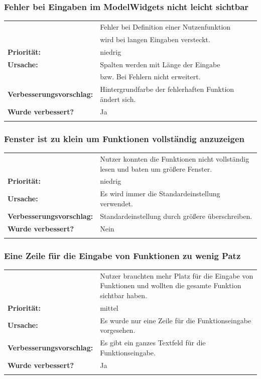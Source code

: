 \documentclass{article}
\begin{document}
\subsubsection*{Fehler bei Eingaben im ModelWidgets nicht leicht sichtbar}
\begin{tabular}{ll}
\begin{tabularx}{\textwidth}{rX}
    \textbf{Beschreibung:} & Fehler bei Definition einer Nutzenfunktion \\
    & wird bei langen Eingaben versteckt. \\
    \textbf{Priorität:} & niedrig\\
    \textbf{Ursache:} & Spalten werden mit Länge der Eingabe \\
    &  bzw. Bei Fehlern nicht erweitert. \\
    \textbf{Verbesserungsvorschlag:} & Hintergrundfarbe der fehlerhaften Funktion ändert sich. \\
    \textbf{Wurde verbessert?} & Ja \\
    \end{tabularx}
\end{tabular}

\subsubsection*{Fenster ist zu klein um Funktionen vollständig anzuzeigen}
\begin{tabular}{ll}
\begin{tabularx}{\textwidth}{rX}
    \textbf{Beschreibung:} & Nutzer konnten die Funktionen nicht vollständig lesen und baten um größere Fenster.\\
    \textbf{Priorität:} & niedrig\\
    \textbf{Ursache:} & Es wird immer die Standardeinstellung verwendet. \\
    \textbf{Verbesserungsvorschlag:} & Standardeinstellung durch größere überschreiben.\\
    \textbf{Wurde verbessert?} & Nein\\
    \end{tabularx}
\end{tabular}

\subsubsection*{Eine Zeile für die Eingabe von Funktionen zu wenig Patz}
\begin{tabular}{ll}
\begin{tabularx}{\textwidth}{rX}
    \textbf{Beschreibung:} &Nutzer brauchten mehr Platz für die Eingabe von Funktionen und wollten die gesamte Funktion sichtbar haben.\\
    \textbf{Priorität:} & mittel\\
    \textbf{Ursache:} & Es wurde nur eine Zeile für die Funktionseingabe vorgesehen. \\
    \textbf{Verbesserungsvorschlag:} & Es gibt ein ganzes Textfeld für die Funktionseingabe.\\
    \textbf{Wurde verbessert?} & Ja\\
    \end{tabularx}
\end{tabular}
\end{document}
